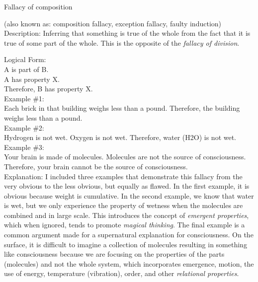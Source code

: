 \documentclass[a4paper,12pt,single,pdftex]{scrartcl}
\begin{document}
Fallacy of composition
    
      (also known as: composition fallacy, exception fallacy, faulty induction)
    \\

  
    Description: Inferring that something is true of the whole from the fact that it is true of some part of the whole.  This is the opposite of the {\it fallacy of division}.

    
      Logical Form:
    \\

    
      A is part of B.
    \\

    
      A has property X.
    \\

    
      Therefore, B has property X.
    \\

    
      Example \#1:
    \\

    
      Each brick in that building weighs less than a pound.  Therefore, the building weighs less than a pound.
    \\

    
      Example \#2:
    \\

    
      Hydrogen is not wet.  Oxygen is not wet.  Therefore, water (H2O) is not wet.
    \\

    
      Example \#3:
    \\

    
      Your brain is made of molecules.  Molecules are not the source of consciousness.  Therefore, your brain cannot be the source of consciousness.
    \\

    
      Explanation: I included three examples that demonstrate this fallacy from the very obvious to the less obvious, but equally as flawed.  In the first example, it is obvious because weight is cumulative.  In the second example, we know that water is wet, but we only experience the property of wetness when the molecules are combined and in large scale.  This introduces the concept of {\it emergent properties}, which when ignored, tends to promote {\it magical thinking}.  The final example is a common argument made for a supernatural explanation for consciousness.  On the surface, it is difficult to imagine a collection of molecules resulting in something like consciousness because we are focusing on the properties of the parts (molecules) and not the whole system, which incorporates emergence, motion, the use of energy, temperature (vibration), order, and other {\it relational properties}.
    \\
\end{document}
